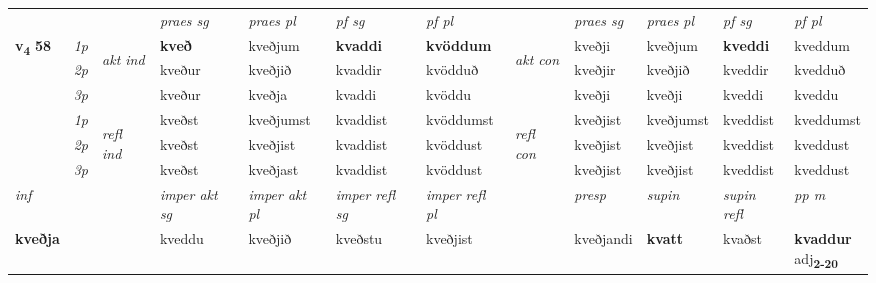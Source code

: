\begin{longtable}[l]{X>{\footnotesize\itshape}llXXXXlXXXX}
\midrule

 & &   & \textit{praes sg}  & \textit{praes pl}    & \textit{ pf sg} & \textit{pf pl} & & \textit{praes sg}  & \textit{praes pl}    & \textit{pf sg} & \textit{pf pl }  \\ \cmidrule{4-7} \cmidrule{9-12}
 \multirow{2}{*}{{{\textbf{v{\textsubscript{4}}} \Large{\textbf{58}}}}}  & 1p & \multirow{3}{*}{\begin{turn}{90}\textit{akt ind}\end{turn}} & \textbf{kveð} & kveðjum & \textbf{kvaddi} & \textbf{kvöddum} & \multirow{3}{*}{\begin{turn}{90}\textit{akt con}\end{turn}} &kveðji & kveðjum & \textbf{kveddi} & kveddum\\*
 & 2p &  &  kveður  & kveðjið & kvaddir & kvödduð & & kveðjir & kveðjið & kveddir & kvedduð \\*
 & 3p &  & kveður & kveðja & kvaddi & kvöddu & & kveðji & kveðji& kveddi & kveddu \\*
\cmidrule{4-7} \cmidrule{9-12}
 & 1p & \multirow{3}{*}{\begin{turn}{90}\textit{refl ind}\end{turn}}  & kveðst & kveðjumst & kvaddist & kvöddumst & \multirow{3}{*}{\begin{turn}{90}\textit{refl con}\end{turn}}  &kveðjist & kveðjumst & kveddist & kveddumst \\*
 & 2p &  & kveðst & kveðjist & kvaddist & kvöddust & &kveðjist & kveðjist & kveddist & kveddust \\*
 & 3p  & & kveðst & kveðjast & kvaddist & kvöddust & & kveðjist & kveðjist& kveddist & kveddust \\*
\cmidrule{4-7} \cmidrule{9-12}

   {\textit{inf}} & &  & \textit{imper akt sg} & \textit{imper akt pl} & \textit{imper refl sg} & \textit{imper refl pl} && \textit{presp} & \textit{supin} & \textit{supin refl} & \textit{pp m} \\*
  {\textbf{kveðja}} & && kveddu  & kveðjið & kveðstu & kveðjist && kveðjandi &  \textbf{kvatt} & kvaðst & \specialcell{\textbf{kvaddur} \\ adj\textbf{\textsubscript{2-20}}} \\*

\midrule


\end{longtable}
